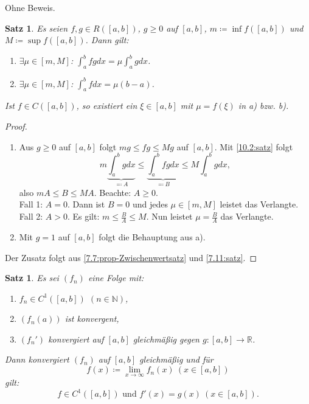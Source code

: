 \documentclass[12pt]{extreport} %
\newcommand{\N}{\mathbb{N}}
\newcommand{\R}{\mathbb{R}}
\theoremstyle{named}
\theoremstyle{itshape}
\newtheorem{satz}[unnamedtheorem]{Satz}
\theoremstyle{normal}
\begin{document}
{Ohne Beweis.

\begin{satz} \label{10.16:satz-Mittelwertsätze}
	Es seien $f, g \in R([a, b])$, $g \geq 0$ auf $[a, b]$, $m \coloneqq \inf f([a, b])$ und $M \coloneqq \sup f([a, b])$. Dann gilt:
	\begin{enumerate}
		\item $\exists \mu \in [m, M]$: $\int_{a}^{b} fg dx = \mu \int_{a}^{b} g dx$.
		\item $\exists \mu \in [m, M]$: $\int_{a}^{b} f dx = \mu (b - a)$.
	\end{enumerate}
	Ist $f \in C([a, b])$, so existiert ein $\xi \in [a, b]$ mit $\mu = f(\xi)$ in a) bzw. b).
\end{satz}

\begin{proof} ~\
	\begin{enumerate}
		\item Aus $g \geq 0$ auf $[a, b]$ folgt $mg \leq fg \leq Mg$ auf $[a, b]$. Mit \ref{10.2:satz} folgt
			$$ m \underbrace{\int_{a}^{b} g dx}_{\eqqcolon A} \leq \underbrace{\int_{a}^{b} fg dx}_{\eqqcolon B} \leq M \int_{a}^{b} g dx, $$
			also $m A \leq B \leq M A$. Beachte: $A \ge 0$. \\
			Fall 1: $A = 0$. Dann ist $B = 0$ und jedes $\mu \in [m, M]$ leistet das Verlangte. \\
			Fall 2: $A > 0$. Es gilt: $m \leq \frac{B}{A} \leq M$. Nun leistet $\mu =\frac{B}{A}$ das Verlangte.
		\item Mit $g=1$ auf $[a,b]$ folgt die Behauptung aus a). 
	\end{enumerate}
	Der Zusatz folgt aus \ref{7.7:prop-Zwischenwertsatz} und \ref{7.11:satz}.
\end{proof}


\begin{satz} \label{10.17:satz}
	Es sei $(f_{n})$ eine Folge mit:
	\begin{enumerate}[label=\roman*\upshape)]
		\item $f_{n} \in C^{1}([a, b])$ $(n \in \N)$,
		\item $(f_{n}(a))$ ist konvergent,
		\item $(f_{n}')$ konvergiert auf $[a, b]$ gleichmä{\ss}ig gegen $g \colon [a, b] \rightarrow \R$.
	\end{enumerate}
	Dann konvergiert $(f_{n})$ auf $[a, b]$ gleichmä{\ss}ig und für $$f(x) \coloneqq \lim_{x \rightarrow \infty} f_{n}(x) ~(x \in [a, b])$$ gilt:
		$$ f \in C^{1}([a, b]) \text{ und } f'(x) = g(x) ~ (x \in  [a, b]). $$
\end{satz}

}
\end{document}
